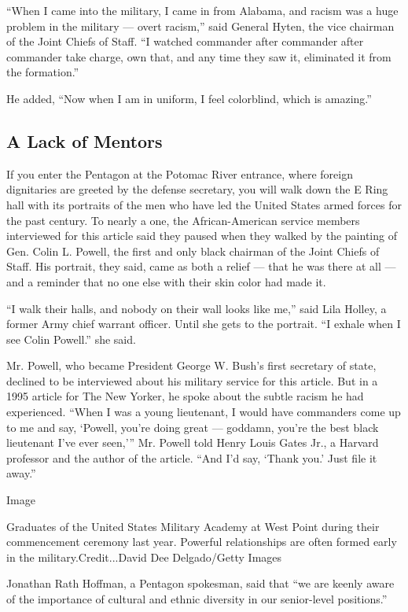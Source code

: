 ``When I came into the military, I came in from Alabama, and racism was
a huge problem in the military --- overt racism,'' said General Hyten,
the vice chairman of the Joint Chiefs of Staff. ``I watched commander
after commander after commander take charge, own that, and any time they
saw it, eliminated it from the formation.''

He added, ``Now when I am in uniform, I feel colorblind, which is
amazing.''

\hypertarget{a-lack-of-mentors}{%
\subsection{A Lack of Mentors}\label{a-lack-of-mentors}}

If you enter the Pentagon at the Potomac River entrance, where foreign
dignitaries are greeted by the defense secretary, you will walk down the
E Ring hall with its portraits of the men who have led the United States
armed forces for the past century. To nearly a one, the African-American
service members interviewed for this article said they paused when they
walked by the painting of Gen. Colin L. Powell, the first and only black
chairman of the Joint Chiefs of Staff. His portrait, they said, came as
both a relief --- that he was there at all --- and a reminder that no
one else with their skin color had made it.

``I walk their halls, and nobody on their wall looks like me,'' said
Lila Holley, a former Army chief warrant officer. Until she gets to the
portrait. ``I exhale when I see Colin Powell.'' she said.

Mr. Powell, who became President George W. Bush's first secretary of
state, declined to be interviewed about his military service for this
article. But in a 1995 article for The New Yorker, he spoke about the
subtle racism he had experienced. ``When I was a young lieutenant, I
would have commanders come up to me and say, `Powell, you're doing great
--- goddamn, you're the best black lieutenant I've ever seen,''' Mr.
Powell told Henry Louis Gates Jr., a Harvard professor and the author of
the article. ``And I'd say, `Thank you.' Just file it away.''

Image

Graduates of the United States Military Academy at West Point during
their commencement ceremony last year. Powerful relationships are often
formed early in the military.Credit...David Dee Delgado/Getty Images

Jonathan Rath Hoffman, a Pentagon spokesman, said that ``we are keenly
aware of the importance of cultural and ethnic diversity in our
senior-level positions.''

